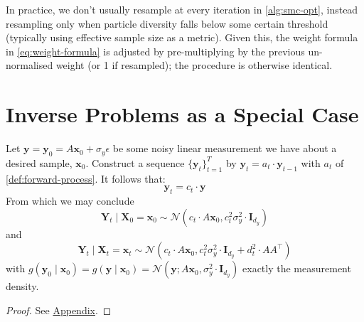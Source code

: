 \begin{remark}
    In practice, we don't usually resample at every iteration in \autoref{alg:smc-opt}, instead
    resampling only when particle diversity falls below some certain threshold (typically using
    effective sample size as a metric). Given this, the weight formula in \autoref{eq:weight-formula} is
    adjusted by pre-multiplying by the previous un-normalised weight (or 1 if resampled); the
    procedure is otherwise identical.
\end{remark}

\section{Inverse Problems as a Special Case} \label{sec:inv-prob-spec-case}

\begin{proposition} \label{prop:obs-gen}
    Let $\mathbf{y} = \mathbf{y}_0 = A\mathbf{x}_0 + \sigma_y\epsilon$ be some noisy linear
    measurement we have about a desired sample, $\mathbf{x}_0$. Construct a sequence
    $\{\mathbf{y}_t\}_{t=1}^T$ by $\mathbf{y}_t = a_t\cdot \mathbf{y}_{t-1}$ with $a_t$ of
    \autoref{def:forward-process}. It follows that:
    \begin{equation}
        \mathbf{y}_t = c_t\cdot \mathbf{y} \label{eq:obs-gen}
    \end{equation}
    From which we may conclude
    \begin{equation*}
        \mathbf{Y}_t \mid \mathbf{X}_0 = \mathbf{x}_0 \sim \mathcal{N}(c_t\cdot A\mathbf{x}_0, c_t^2\sigma_y^2\cdot \mathbf{I}_{d_y})
    \end{equation*}
    and
    \begin{equation}
        \mathbf{Y}_t \mid \mathbf{X}_t = \mathbf{x}_t \sim \mathcal{N}(c_t\cdot A\mathbf{x}_0, c_t^2\sigma_y^2\cdot \mathbf{I}_{d_y} + d_t^2\cdot AA^\top) \label{eq:obs-likelihood}
    \end{equation}
    with $g(\mathbf{y}_0 \mid \mathbf{x}_0) = g(\mathbf{y} \mid \mathbf{x}_0) = \mathcal{N}(\mathbf{y}; A\mathbf{x}_0, \sigma_y^2\cdot \mathbf{I}_{d_y})$
    exactly the measurement density.
\end{proposition}

\begin{proof}
    See \hyperref[prf:obs-generation]{Appendix}.
\end{proof}

